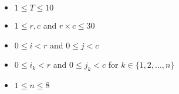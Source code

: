 \begin{itemize}
	\tightlist
\item $1\le T\le 10$
\item $1 \le r, c$ and $r\times c \le 30$
\item $0 \le i < r$ and $0 \le j < c$
\item $0 \le i_k < r$ and $0 \le j_k < c$ for $k \in \{1,2,...,n\}$
\item $1 \le n \le 8$
\end{itemize}
\newpage
